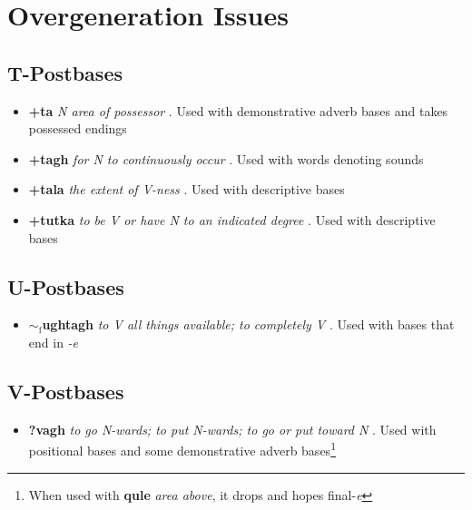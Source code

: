 \documentclass{article}
\begin{document}

\section{Overgeneration Issues}

\subsection{\textbf{T}-Postbases}

\begin{itemize}
\renewcommand\labelitemi{$\cdot$}
\item \textbf{+ta} \textit{N area of possessor} . Used with demonstrative adverb bases and takes possessed endings
\item \textbf{+tagh} \textit{for N to continuously occur} . Used with words denoting sounds
\item \textbf{+tala} \textit{the extent of V-ness} . Used with descriptive bases
\item \textbf{+tutka} \textit{to be V or have N to an indicated degree} . Used with descriptive bases
\end{itemize}

\subsection{\textbf{U}-Postbases}

\begin{itemize}
\renewcommand\labelitemi{$\cdot$}
\item \textbf{$\sim_\text{f}$ughtagh} \textit{to V all things available; to completely V} . Used with bases that end in \textit{-e} 
\end{itemize}

\subsection{\textbf{V}-Postbases}

\begin{itemize}
\renewcommand\labelitemi{$\cdot$}
\item \textbf{?vagh} \textit{to go N-wards; to put N-wards; to go or put toward N} . Used with positional bases and some demonstrative adverb bases\footnote{When used with \textbf{qule} \textit{area above}, it drops and hopes final-\textit{e}}
\end{itemize}
\end{document}
